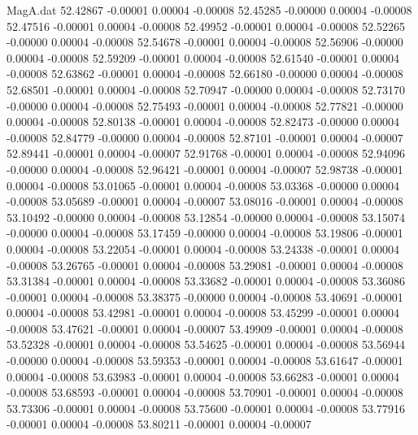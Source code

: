 \begin{filecontents}{MagA.dat}
  52.42867   -0.00001    0.00004   -0.00008
  52.45285   -0.00000    0.00004   -0.00008
  52.47516   -0.00001    0.00004   -0.00008
  52.49952   -0.00001    0.00004   -0.00008
  52.52265   -0.00000    0.00004   -0.00008
  52.54678   -0.00001    0.00004   -0.00008
  52.56906   -0.00000    0.00004   -0.00008
  52.59209   -0.00001    0.00004   -0.00008
  52.61540   -0.00001    0.00004   -0.00008
  52.63862   -0.00001    0.00004   -0.00008
  52.66180   -0.00000    0.00004   -0.00008
  52.68501   -0.00001    0.00004   -0.00008
  52.70947   -0.00000    0.00004   -0.00008
  52.73170   -0.00000    0.00004   -0.00008
  52.75493   -0.00001    0.00004   -0.00008
  52.77821   -0.00000    0.00004   -0.00008
  52.80138   -0.00001    0.00004   -0.00008
  52.82473   -0.00000    0.00004   -0.00008
  52.84779   -0.00000    0.00004   -0.00008
  52.87101   -0.00001    0.00004   -0.00007
  52.89441   -0.00001    0.00004   -0.00007
  52.91768   -0.00001    0.00004   -0.00008
  52.94096   -0.00000    0.00004   -0.00008
  52.96421   -0.00001    0.00004   -0.00007
  52.98738   -0.00001    0.00004   -0.00008
  53.01065   -0.00001    0.00004   -0.00008
  53.03368   -0.00000    0.00004   -0.00008
  53.05689   -0.00001    0.00004   -0.00007
  53.08016   -0.00001    0.00004   -0.00008
  53.10492   -0.00000    0.00004   -0.00008
  53.12854   -0.00000    0.00004   -0.00008
  53.15074   -0.00000    0.00004   -0.00008
  53.17459   -0.00000    0.00004   -0.00008
  53.19806   -0.00001    0.00004   -0.00008
  53.22054   -0.00001    0.00004   -0.00008
  53.24338   -0.00001    0.00004   -0.00008
  53.26765   -0.00001    0.00004   -0.00008
  53.29081   -0.00001    0.00004   -0.00008
  53.31384   -0.00001    0.00004   -0.00008
  53.33682   -0.00001    0.00004   -0.00008
  53.36086   -0.00001    0.00004   -0.00008
  53.38375   -0.00000    0.00004   -0.00008
  53.40691   -0.00001    0.00004   -0.00008
  53.42981   -0.00001    0.00004   -0.00008
  53.45299   -0.00001    0.00004   -0.00008
  53.47621   -0.00001    0.00004   -0.00007
  53.49909   -0.00001    0.00004   -0.00008
  53.52328   -0.00001    0.00004   -0.00008
  53.54625   -0.00001    0.00004   -0.00008
  53.56944   -0.00000    0.00004   -0.00008
  53.59353   -0.00001    0.00004   -0.00008
  53.61647   -0.00001    0.00004   -0.00008
  53.63983   -0.00001    0.00004   -0.00008
  53.66283   -0.00001    0.00004   -0.00008
  53.68593   -0.00001    0.00004   -0.00008
  53.70901   -0.00001    0.00004   -0.00008
  53.73306   -0.00001    0.00004   -0.00008
  53.75600   -0.00001    0.00004   -0.00008
  53.77916   -0.00001    0.00004   -0.00008
  53.80211   -0.00001    0.00004   -0.00007

\end{filecontents}
